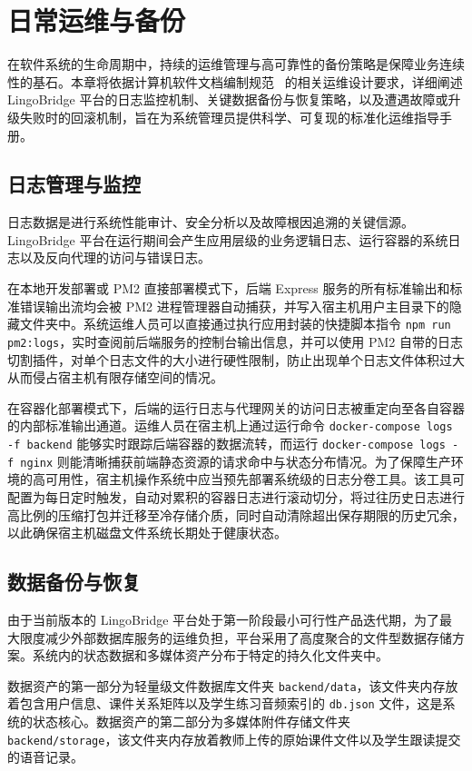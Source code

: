 \chapter{日常运维与备份}

在软件系统的生命周期中，持续的运维管理与高可靠性的备份策略是保障业务连续性的基石。本章将依据计算机软件文档编制规范~\cite{gb8567} 的相关运维设计要求，详细阐述 LingoBridge 平台的日志监控机制、关键数据备份与恢复策略，以及遭遇故障或升级失败时的回滚机制，旨在为系统管理员提供科学、可复现的标准化运维指导手册。

\section{日志管理与监控}

日志数据是进行系统性能审计、安全分析以及故障根因追溯的关键信源。LingoBridge 平台在运行期间会产生应用层级的业务逻辑日志、运行容器的系统日志以及反向代理的访问与错误日志。

在本地开发部署或 PM2 直接部署模式下，后端 Express 服务的所有标准输出和标准错误输出流均会被 PM2 进程管理器自动捕获，并写入宿主机用户主目录下的隐藏文件夹中。系统运维人员可以直接通过执行应用封装的快捷脚本指令 \texttt{npm run pm2:logs}，实时查阅前后端服务的控制台输出信息，并可以使用 PM2 自带的日志切割插件，对单个日志文件的大小进行硬性限制，防止出现单个日志文件体积过大从而侵占宿主机有限存储空间的情况。

在容器化部署模式下，后端的运行日志与代理网关的访问日志被重定向至各自容器的内部标准输出通道。运维人员在宿主机上通过运行命令 \texttt{docker-compose logs -f backend} 能够实时跟踪后端容器的数据流转，而运行 \texttt{docker-compose logs -f nginx} 则能清晰捕获前端静态资源的请求命中与状态分布情况。为了保障生产环境的高可用性，宿主机操作系统中应当预先部署系统级的日志分卷工具。该工具可配置为每日定时触发，自动对累积的容器日志进行滚动切分，将过往历史日志进行高比例的压缩打包并迁移至冷存储介质，同时自动清除超出保存期限的历史冗余，以此确保宿主机磁盘文件系统长期处于健康状态。

\section{数据备份与恢复}

由于当前版本的 LingoBridge 平台处于第一阶段最小可行性产品迭代期，为了最大限度减少外部数据库服务的运维负担，平台采用了高度聚合的文件型数据存储方案。系统内的状态数据和多媒体资产分布于特定的持久化文件夹中。

数据资产的第一部分为轻量级文件数据库文件夹 \texttt{backend/data}，该文件夹内存放着包含用户信息、课件关系矩阵以及学生练习音频索引的 \texttt{db.json} 文件，这是系统的状态核心。数据资产的第二部分为多媒体附件存储文件夹 \texttt{backend/storage}，该文件夹内存放着教师上传的原始课件文件以及学生跟读提交的语音记录。

